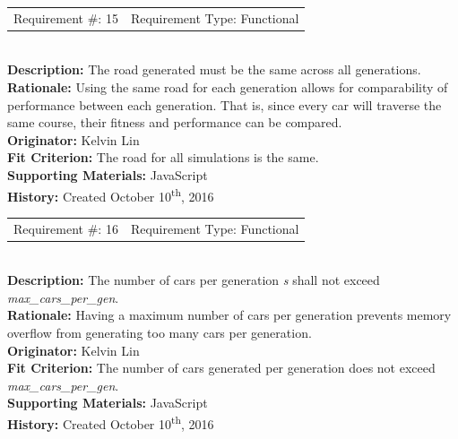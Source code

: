 \documentclass[12pt, titlepage]{article}
\begin{document}
\begin{reqbox}
%
\begin{tabular}{cc}
Requirement \#: 15 & Requirement Type: Functional \\
\end{tabular} \\
%
\textbf{Description:} The road generated must be the same across all 
generations. \\
\textbf{Rationale:} Using the same road for each generation allows for 
comparability of performance between each generation. That is, since every car 
will traverse the same course, their fitness and performance can be compared. \\
\textbf{Originator:} Kelvin Lin\\
\textbf{Fit Criterion:} The road for all simulations is the same. \\
%  
\textbf{Supporting Materials:} JavaScript \\
\textbf{History:} Created October 10\textsuperscript{th}, 2016
%
\end{reqbox}

\begin{reqbox}
%
\begin{tabular}{cc}
Requirement \#: 16 & Requirement Type: Functional \\
\end{tabular} \\
%
\textbf{Description:} The number of cars per generation \textit{s} shall not 
exceed \textit{max\_cars\_per\_gen}. \\
\textbf{Rationale:} Having a maximum number of cars per generation prevents 
memory overflow from generating too many cars per generation.\\
\textbf{Originator:} Kelvin Lin\\
\textbf{Fit Criterion:} The number of cars generated per generation does not 
exceed \textit{max\_cars\_per\_gen}.\\
%  
\textbf{Supporting Materials:} JavaScript \\
\textbf{History:} Created October 10\textsuperscript{th}, 2016
%
\end{reqbox}
\end{document}
